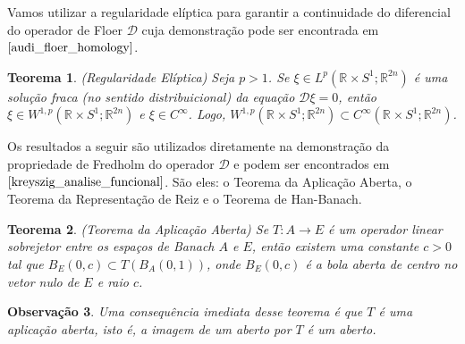 \documentclass[12pt]{book}
\newtheorem{teorema}{Teorema}[section]
\newtheorem{observacao}[teorema]{Observação}
\newenvironment{prova}[1]{$\square$ #1}{\hfill$\blacksquare$}
\newcommand{\circulo}{S^{1}}
\newcommand{\diferencialfloerabrev}{\mathcal{D}}
\newcommand{\derivada}[2]{\frac{d #1}{d #2}}
\newcommand{\espacoLpcontradominio}[2]{L^{p}(#1;#2)}
\newcommand{\espacosobolevcontradominio}[2]{W^{1,p}(#1;#2)}
\newcommand{\espacosobolevdois}[2]{\espacosobolevgeral{2}{#1, #2}}
\newcommand{\espacosobolevgeral}[2]{W^{1,#1}(#2)}
\newcommand{\retacartesianocirculo}{\real{} \times \circulo}
\newcommand{\real}[1]{\mathbb{R}^{#1}}
\begin{document}
	
	Vamos utilizar a regularidade elíptica para garantir a continuidade do diferencial do operador de Floer $\diferencialfloerabrev$ cuja demonstração pode ser encontrada em $\cite{audi_floer_homology}$.
	
	\begin{teorema}\label{teorema_regularidade_eliptica}
		(Regularidade Elíptica) Seja $p> 1$. Se $\xi \in \espacoLpcontradominio{\retacartesianocirculo}{\real{2n}}$ é uma solução fraca (no sentido distribuicional) da equação $\diferencialfloerabrev\xi =0$, então $\xi \in \espacosobolevcontradominio{\retacartesianocirculo}{\real{2n}}$ e $\xi \in C^{\infty}$. Logo, $\espacosobolevcontradominio{\retacartesianocirculo}{\real{2n}} \subset C^{\infty}(\retacartesianocirculo;\real{2n})$.
	\end{teorema} 
		
	Os resultados a seguir são utilizados diretamente na demonstração da propriedade de Fredholm do operador $\diferencialfloerabrev$ e podem ser encontrados em $\cite{kreyszig_analise_funcional}$. São eles: o Teorema da Aplicação Aberta, o Teorema da Representação de Reiz e o Teorema de Han-Banach.
	
	\begin{teorema}\label{teorema_aplicacao_aberta}
		(Teorema da Aplicação Aberta) Se $T : A \to E$ é um operador linear sobrejetor entre os espaços de Banach $A$ e $E$, então existem uma constante $c>0$ tal que $B_{E}(0,c) \subset T(B_{A}(0,1))$, onde $B_{E}(0,c) $ é a bola aberta de centro no vetor nulo de $E$ e raio $c$.
	\end{teorema}
	
	\begin{observacao}
		Uma consequência imediata desse teorema é que $T$ é uma aplicação aberta, isto é, a imagem de um aberto por $T$ é um aberto.
	\end{observacao}
	
\end{document}
